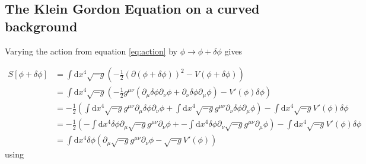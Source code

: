 \documentclass[a4paper]{article}
\begin{document}
\subsection{The Klein Gordon Equation on a curved background}
Varying the action from equation \ref{eq:action} by $\phi \rightarrow \phi + \delta \phi$ gives

\begin{align*}
    S[\phi + \delta \phi] &= \int \mathrm{d} x^4 \sqrt{-g} \left( - \frac{1}{2} (\partial (\phi + \delta \phi))^2 - V(\phi + \delta \phi)  \right) \\
    &= \int \mathrm{d}x^4 \sqrt{-g} \left( - \frac{1}{2} g^{\mu \nu} (\partial_\mu \delta \phi \partial_\nu \phi + \partial_\nu \delta \phi \partial_\mu \phi) - V'(\phi) \delta \phi \right) \\
    &= - \frac{1}{2} \left( \int \mathrm{d}x^4 \sqrt{-g} g^{\mu \nu} \partial_\mu \delta \phi \partial_\nu \phi + \int \mathrm{d}x^4 \sqrt{-g} g^{\mu \nu} \partial_\nu \delta \phi \partial_\mu \phi \right) - \int \mathrm{d} x^4 \sqrt{-g} V'(\phi) \delta \phi \\
    &= - \frac{1}{2} \left( - \int \mathrm{d}x^4 \delta \phi \partial_\mu \sqrt{-g} g^{\mu \nu} \partial_\nu \phi +
                            - \int \mathrm{d}x^4 \delta \phi \partial_\nu \sqrt{-g} g^{\mu \nu} \partial_\mu \phi \right) - \int \mathrm{d} x^4 \sqrt{-g} V'(\phi) \delta \phi \\
    &= \int \mathrm{d} x^4 \delta \phi \left( \partial_\mu \sqrt{-g} g^{\mu \nu} \partial_\nu \phi - \sqrt{-g} V'(\phi) \right)
\end{align*}
using
\end{document}
